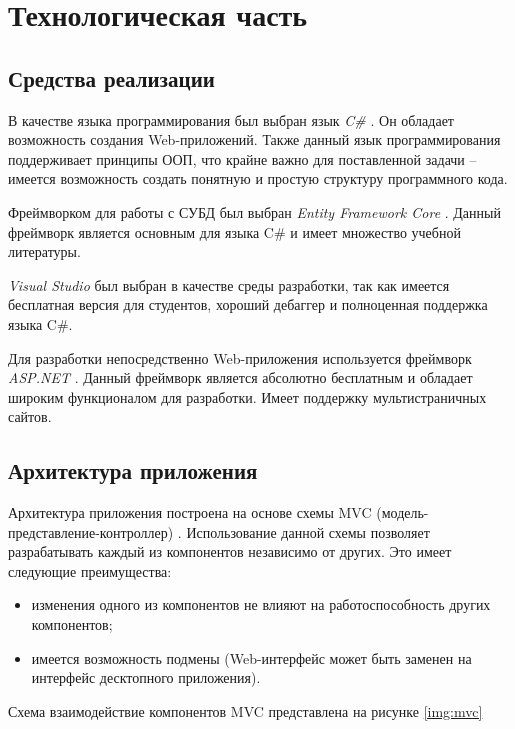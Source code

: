 \chapter{Технологическая часть}

\section{Средства реализации}

В качестве языка программирования был выбран язык \textit{C\#} \cite{csharp}. Он обладает возможность создания Web-приложений. Также данный язык программирования поддерживает принципы ООП, что крайне важно для поставленной задачи -- имеется возможность создать понятную и простую структуру программного кода.

Фреймворком для работы с СУБД был выбран \textit{Entity Framework Core} \cite{ef_core}. Данный фреймворк является основным для языка C\# и имеет множество учебной литературы.

\textit{Visual Studio} \cite{vs} был выбран в качестве среды разработки, так как имеется бесплатная версия для студентов, хороший дебаггер и полноценная поддержка языка C\#. 

Для разработки непосредственно Web-приложения используется фреймворк \textit{ASP.NET} \cite{asp}. Данный фреймворк является абсолютно бесплатным и обладает широким функционалом для разработки. Имеет поддержку мультистраничных сайтов.


\section{Архитектура приложения}

Архитектура приложения построена на основе схемы MVC (модель-представление-контроллер) \cite{mvc}. Использование данной схемы позволяет разрабатывать каждый из компонентов независимо от других. Это имеет следующие преимущества:

\begin{itemize}
    \item изменения одного из компонентов не влияют на работоспособность других компонентов;
    \item имеется возможность подмены (Web-интерфейс может быть заменен на интерфейс десктопного приложения).
\end{itemize}

Схема взаимодействие компонентов MVC представлена на рисунке \ref{img:mvc}


